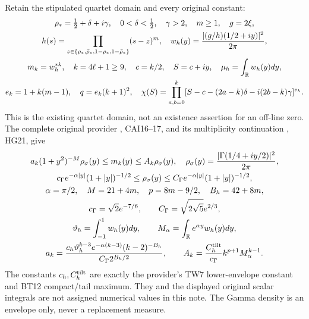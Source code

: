 \documentclass[11pt]{article}
\begin{document}
Retain the stipulated quartet domain and every original constant:
\begin{equation}\label{mprec:eq:objects}
\begin{gathered}
 \rho_*=\tfrac12+\delta+i\gamma,\quad 0<\delta<\tfrac12,
 \quad\gamma>2,\quad m\ge1,\quad g=2\xi,\\
 h(s)=\prod_{z\in\{\rho_*,\bar\rho_*,1-\rho_*,1-\bar\rho_*\}}(s-z)^m,
 \quad w_h(y)=\frac{|(g/h)(1/2+iy)|^2}{2\pi},\\
 m_k=w_h^{*k},\quad k=4\ell+1\ge9,\quad
 c=k/2,\quad S=c+iy,\quad \mu_h=\int_\mathbb R w_h(y)dy,\\
 e_k=1+k(m-1),\quad q=e_k(k+1)^2,\quad
 \chi(S)=\prod_{a,b=0}^k
 [S-c-(2a-k)\delta-i(2b-k)\gamma]^{e_k}.
\end{gathered}
\end{equation}
This is the existing quartet domain, not an existence assertion for
an off-line zero. The complete original provider \cite{mprec:CAI},
CAI16--17, and its multiplicity continuation \cite{mprec:HG}, HG21, give
\begin{equation}\label{mprec:eq:envelope}
\begin{gathered}
 a_k(1+y^2)^{-M}\rho_\sigma(y)\le m_k(y)\le A_k\rho_\sigma(y),
 \quad \rho_\sigma(y)=\frac{|\Gamma(1/4+iy/2)|^2}{2\pi},\\
 c_\Gamma e^{-\alpha|y|}(1+|y|)^{-1/2}
 \le\rho_\sigma(y)\le
 C_\Gamma e^{-\alpha|y|}(1+|y|)^{-1/2},\\
 \alpha=\pi/2,\quad M=21+4m,\quad p=8m-9/2,\quad B_h=42+8m,\\
 c_\Gamma=\sqrt2e^{-7/6},\qquad C_\Gamma=\sqrt{2\sqrt5}e^{2/3},\\
 \vartheta_h=\int_{-1}^1w_h(y)dy,\qquad
 M_\alpha=\int_\mathbb R e^{\alpha y}w_h(y)dy,\\
 a_k=\frac{c_h\vartheta_h^{k-3}e^{-\alpha(k-3)}(k-2)^{-B_h}}
 {C_\Gamma2^{B_h/2}},\qquad
 A_k=\frac{C_h^{\rm tilt}}{c_\Gamma}k^{p+1}M_\alpha^{k-1}.
\end{gathered}
\end{equation}
The constants $c_h,C_h^{\rm tilt}$ are exactly the provider's TW7
lower-envelope constant and BT12 compact/tail maximum. They and the
displayed original scalar integrals are not assigned numerical values
in this note. The Gamma density is an envelope only, never a
replacement measure.
\end{document}

